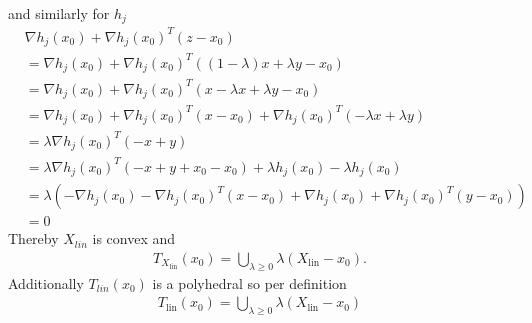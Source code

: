 and similarly for $h_j$
\begin{align}
    &\nabla h_j(x_0) + \nabla h_j(x_0)^{T} (z-x_0)\\
    &=\nabla h_j(x_0) + \nabla h_j(x_0)^{T} ((1-\lambda)x + \lambda y-x_0)\\
    &=\nabla h_j(x_0) + \nabla h_j(x_0)^{T} (x-\lambda x + \lambda y-x_0)\\
    &=\nabla h_j(x_0) + \nabla h_j(x_0)^{T} (x-x_0)
    + \nabla h_j(x_0)^{T}(-\lambda x + \lambda y)\\
    &= \lambda \nabla h_j(x_0)^{T}(-x + y)\\
    &= \lambda \nabla h_j(x_0)^{T}(- x + y + x_0 - x_0) + \lambda h_j(x_0)
    -\lambda h_j(x_0)\\
    &=\lambda\left(-\nabla h_j(x_0) - \nabla h_j(x_0)^{T} (x-x_0)
    + \nabla h_j(x_0) + \nabla h_j(x_0)^{T} (y-x_0)\right)\\
    &= 0
\end{align}
Thereby $X_{lin}$ is convex and
\begin{align}
    T_{X_\text{lin}}(x_0) = \bigcup_{\lambda \ge 0 }\lambda \left(
    X_\text{lin} - x_0 \right) .
\end{align}
Additionally $T_{lin}(x_0)$ is a polyhedral so per definition
\begin{align}
    T_\text{lin}(x_0) = \bigcup_{\lambda \ge 0 }\lambda \left( X_\text{lin} -
    x_0 \right)
\end{align}

